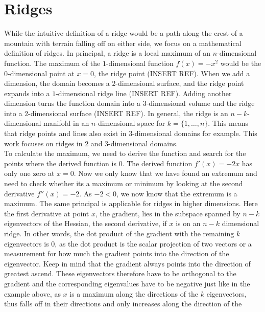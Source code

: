 \section{Ridges}\label{sec:Ridges}

While the intuitive definition of a ridge would be a path along the
crest of a mountain with terrain falling off on either side, we focus on
a mathematical definition of ridges. In principal, a ridge is a local
maximum of an $n$-dimensional function. The maximum of the
$1$-dimensional function $f(x) = -x^2$ would be the $0$-dimensional
point at $x=0$, the ridge point (INSERT REF). When we add a dimension,
the domain becomes a $2$-dimensional surface, and the ridge point
expands into a $1$-dimensional ridge line (INSERT REF). Adding another
dimension turns the function domain into a $3$-dimensional volume and
the ridge into a $2$-dimensional surface (INSERT REF). In general, the
ridge is an $n-k$-dimensional manifold in an $n$-dimensional space for
$k=\{1, \dots, n\}$. This means that ridge points and lines also exist
in $3$-dimensional domains for example. This work focuses on ridges in
$2$ and $3$-dimensional domains.\\
To calculate the maximum, we need to derive the function and search for
the points where the derived function is $0$. The derived function
$f'(x)=-2x$ has only one zero at $x=0$. Now we only know that we have
found an extremum and need to check whether its a maximum or minimum by
looking at the second derivative $f''(x)=-2$. As $-2 < 0$, we now know
that the extremum is a maximum. The same principal is applicable for
ridges in higher dimensions. Here the first derivative at point $x$, the
gradient, lies in the subspace spanned by $n-k$ eigenvectors of the
Hessian, the second derivative, if $x$ is on an $n-k$ dimensional ridge.
In other words, the dot product of the gradient with the remaining $k$
eigenvectors is $0$, as the dot product is the scalar projection of two
vectors or a measurement for how much the gradient points into the
direction of the eigenvector. Keep in mind that the gradient always
points into the direction of greatest ascend. These eigenvectors
therefore have to be orthogonal to the gradient and the corresponding
eigenvalues have to be negative just like in the example above, as $x$
is a maximum along the directions of the $k$ eigenvectors, thus falls
off in their directions and only increases along the direction of the
